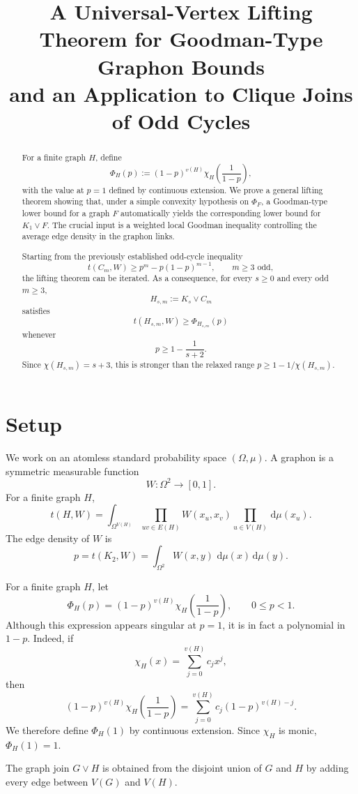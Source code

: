 \documentclass[11pt]{article}
\title{A Universal-Vertex Lifting Theorem for Goodman-Type Graphon Bounds\\
and an Application to Clique Joins of Odd Cycles}
\author{}
\date{}
\newcommand{\1}{\mathbf{1}}
\newcommand{\dd}{\,\mathrm{d}}
\newcommand{\join}{\vee}
\begin{document}
\maketitle

\begin{abstract}
For a finite graph $H$, define
\[
\Phi_H(p)
:=
(1-p)^{v(H)}
\chi_H\!\left(\frac{1}{1-p}\right),
\]
with the value at $p=1$ defined by continuous extension.
We prove a general lifting theorem showing that, under a simple convexity
hypothesis on $\Phi_F$, a Goodman-type lower bound for a graph $F$
automatically yields the corresponding lower bound for $K_1\join F$.
The crucial input is a weighted local Goodman inequality controlling
the average edge density in the graphon links.

Starting from the previously established odd-cycle inequality
\[
t(C_m,W)\ge p^m-p(1-p)^{m-1},
\qquad m\ge 3\text{ odd},
\]
the lifting theorem can be iterated.  As a consequence, for every
$s\ge 0$ and every odd $m\ge 3$,
\[
H_{s,m}:=K_s\join C_m
\]
satisfies
\[
t(H_{s,m},W)\ge \Phi_{H_{s,m}}(p)
\]
whenever
\[
p\ge 1-\frac1{s+2}.
\]
Since $\chi(H_{s,m})=s+3$, this is stronger than the relaxed range
$p\ge 1-1/\chi(H_{s,m})$.
\end{abstract}


\section{Setup}

We work on an atomless standard probability space
$(\Omega,\mu)$.
A graphon is a symmetric measurable function
\[
W:\Omega^2\to[0,1].
\]
For a finite graph $H$,
\[
t(H,W)
=
\int_{\Omega^{V(H)}}
\prod_{uv\in E(H)}
W(x_u,x_v)
\prod_{u\in V(H)}\dd\mu(x_u).
\]
The edge density of $W$ is
\[
p=t(K_2,W)
=
\int_{\Omega^2}W(x,y)\,\dd\mu(x)\dd\mu(y).
\]

For a finite graph $H$, let
\[
\Phi_H(p)
=
(1-p)^{v(H)}
\chi_H\!\left(\frac1{1-p}\right),
\qquad 0\le p<1.
\]
Although this expression appears singular at $p=1$, it is in fact a
polynomial in $1-p$.  Indeed, if
\[
\chi_H(x)=\sum_{j=0}^{v(H)}c_jx^j,
\]
then
\[
(1-p)^{v(H)}
\chi_H\!\left(\frac1{1-p}\right)
=
\sum_{j=0}^{v(H)}
c_j(1-p)^{v(H)-j}.
\]
We therefore define $\Phi_H(1)$ by continuous extension.
Since $\chi_H$ is monic, $\Phi_H(1)=1$.

The graph join $G\join H$ is obtained from the disjoint union
of $G$ and $H$ by adding every edge between $V(G)$ and $V(H)$.
\end{document}
